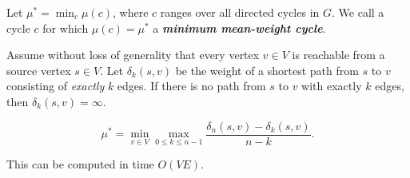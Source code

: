 Let $\mu^\ast = \min_c \mu(c)$, where $c$ ranges over all directed cycles in $G$.
We call a cycle $c$ for which $\mu(c)=\mu^\ast$ a \textbf{\textit{minimum mean-weight cycle}}.

Assume without loss of generality that every vertex $v \in V$ is reachable from a source vertex $s \in V$.
Let $\delta_k (s, v)$ be the weight of a shortest path from $s$ to $v$ consisting of \textit{exactly} $k$ edges.
If there is no path from $s$ to $v$ with exactly $k$ edges, then $\delta_k (s, v) = \infty$.

$$\mu^\ast = \min_{v \in V} \max_{0 \le k \le n - 1}
\frac{\delta_n (s, v) - \delta_k (s, v)}{n - k}.$$

This can be computed in time $O(V E)$.
